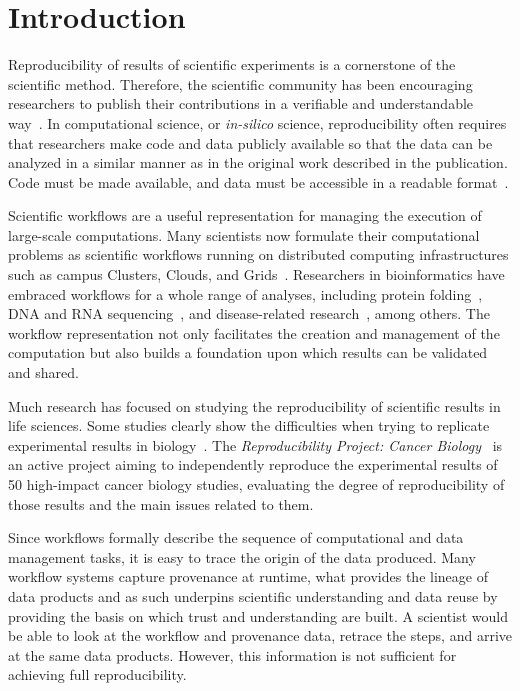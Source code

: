 \section{Introduction}

Reproducibility of results of scientific experiments is a cornerstone of the scientific 
method. Therefore, the scientific community has been encouraging researchers 
to publish their contributions in a verifiable and understandable 
way~\cite{YaleRoundtable09, James-XSEDE-2014}. In computational science, 
or \emph{in-silico} science, reproducibility often requires that researchers make 
code and data publicly available so that the data can be analyzed in a similar 
manner as in the original work described in the publication. Code must be made available, 
and data must be accessible in a readable format~\cite{bookReproducibility}. 

Scientific workflows are a useful representation for managing the execution of large-scale 
computations. Many scientists now formulate their computational problems as scientific 
workflows running on distributed computing infrastructures such as campus Clusters, 
Clouds, and Grids~\cite{workflowBook}. Researchers in bioinformatics have 
embraced workflows for a whole range of analyses, including protein folding~\cite{craddock2006science}, 
DNA and RNA sequencing~\cite{blankenberg2010galaxy, giardine2005galaxy, kepler-clotho}, 
and disease-related research~\cite{fisher2009systematic, gaizauskas2004}, among others.
The workflow representation not only facilitates the creation and management of the 
computation but also builds a foundation upon which results can be validated and 
shared. 

Much research has focused on studying the reproducibility of scientific results 
in life sciences. Some studies clearly show the difficulties when trying to replicate 
experimental results in biology~\cite{Ioannidis2009}. The \emph{Reproducibility 
Project: Cancer Biology}~\cite{ErringtonCancerRerpoducibility} is an active project 
aiming to independently reproduce the experimental results of 50 high-impact cancer 
biology studies, evaluating the degree of reproducibility of those results and the main 
issues related to them.


Since workflows formally describe the sequence of computational and data 
management tasks, it is easy to trace the origin of the data produced. Many workflow 
systems capture provenance at runtime, what provides the lineage of data products 
and as such underpins scientific understanding and data reuse by providing the basis on which 
trust and understanding are built. A scientist would be able to look at the workflow and 
provenance data, retrace the steps, and arrive at the same data products. 
However, this information is not sufficient for achieving full reproducibility.

